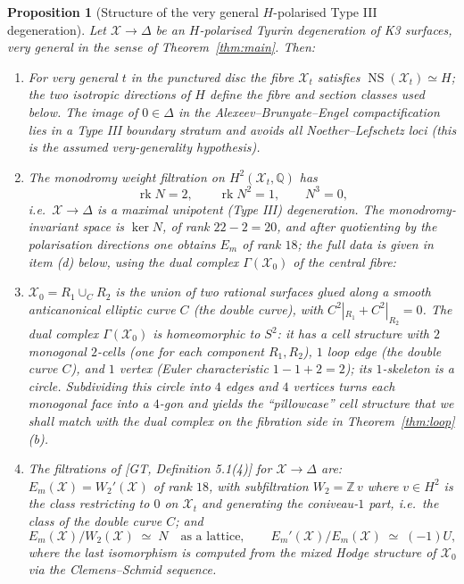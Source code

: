 \documentclass[11pt]{article}
\newtheorem{proposition}[theorem]{Proposition}
\newcommand{\X}{\mathcal{X}}
\newcommand{\D}{\Delta}
\newcommand{\bZ}{\mathbb{Z}}
\newcommand{\bQ}{\mathbb{Q}}
\DeclareMathOperator{\rk}{rk}
\DeclareMathOperator{\NS}{NS}
\begin{document}
\begin{proposition}[Structure of the very general $H$-polarised Type III
degeneration]\label{prop:deg-side}
Let $\X\to\D$ be an $H$-polarised Tyurin degeneration of K3 surfaces, very
general in the sense of Theorem~\ref{thm:main}. Then:
\begin{enumerate}[label=(\alph*),leftmargin=2em]
\item For very general $t$ in the punctured disc the fibre $\X_t$
satisfies $\NS(\X_t)\simeq H$; the two isotropic directions of $H$
define the fibre and section classes used below. The image of $0\in\D$
in the Alexeev--Brunyate--Engel compactification lies in a Type III
boundary stratum and avoids all Noether--Lefschetz loci (this is the
assumed very-generality hypothesis).
\item The monodromy weight filtration on $H^2(\X_t,\bQ)$ has
\[
\rk N = 2,\qquad \rk N^2 = 1,\qquad N^3=0,
\]
i.e.\ $\X\to\D$ is a maximal unipotent (Type III) degeneration. The
monodromy-invariant space is $\ker N$, of rank $22-2=20$, and after
quotienting by the polarisation directions one obtains
$E_m$ of rank $18$; the full data is given in item (d) below, using the
dual complex $\Gamma(\X_0)$ of the central fibre:
\item $\X_0=R_1\cup_C R_2$ is the union of two rational surfaces glued along
a smooth anticanonical elliptic curve $C$ (the double curve), with
$C^2|_{R_1}+C^2|_{R_2}=0$. The dual complex $\Gamma(\X_0)$ is homeomorphic
to $S^2$: it has a cell structure with $2$ monogonal $2$-cells (one for
each component $R_1,R_2$), $1$ loop edge (the double curve $C$), and $1$
vertex (Euler characteristic $1-1+2=2$); its $1$-skeleton is a circle.
Subdividing this circle into $4$ edges and $4$ vertices turns each
monogonal face into a $4$-gon and yields the ``pillowcase'' cell
structure that we shall match with the dual complex on the fibration side
in Theorem~\ref{thm:loop}(b).
\item The filtrations of [GT, Definition 5.1(4)] for $\X\to\D$ are:
$E_m(\X)=W_2'(\X)$ of rank $18$, with subfiltration $W_2 = \bZ\, v$ where
$v\in H^2$ is the class restricting to $0$ on $\X_t$ and generating the
coniveau-$1$ part, i.e.\ the class of the double curve $C$; and
\[
E_m(\X)/W_2(\X)\;\simeq\;N
\quad\text{as a lattice},
\qquad
E_m'(\X)/E_m(\X)\;\simeq\;(-1)U,
\]
where the last isomorphism is computed from the mixed Hodge structure of
$\X_0$ via the Clemens--Schmid sequence.
\end{enumerate}
\end{proposition}
\end{document}

